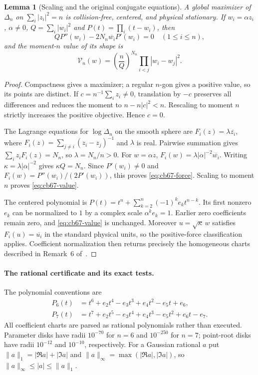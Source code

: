 \documentclass[11pt,a4paper]{article}
\newtheorem{lemma}[theorem]{Lemma}
\theoremstyle{remark}
\begin{document}
\begin{lemma}[Scaling and the original conjugate equations]
\label{lem:cb67-reduction}
A global maximizer of $\Delta_n$ on $\sum_i|z_i|^2=n$ is collision-free,
centered, and physical stationary. If $w_i=\alpha z_i$, $\alpha\ne0$,
$Q=\sum_i|w_i|^2$ and $P(t)=\prod_i(t-w_i)$, then
\begin{equation}\label{eq:cb67-force}
 QP''(w_i)-2N_n\overline{w_i}P'(w_i)=0\quad(1\le i\le n),
\end{equation}
and the moment-$n$ value of its shape is
\begin{equation}\label{eq:cb67-value}
 \mathcal V_n(w)=\left(\frac nQ\right)^{N_n}
                    \prod_{i<j}|w_i-w_j|^2.
\end{equation}
\end{lemma}
\begin{proof}
Compactness gives a maximizer; a regular $n$-gon gives a positive value,
so its points are distinct. If $c=n^{-1}\sum_i z_i\ne0$, translation by
$-c$ preserves all differences and reduces the moment to $n-n|c|^2<n$.
Rescaling to moment $n$ strictly increases the positive objective. Hence
$c=0$.

The Lagrange equations for $\log\Delta_n$ on the smooth sphere are
$F_i(z)=\lambda\overline{z_i}$, where
$F_i(z)=\sum_{j\ne i}(z_i-z_j)^{-1}$ and $\lambda$ is real.
Pairwise summation gives $\sum_i z_iF_i(z)=N_n$, so
$\lambda=N_n/n>0$. For $w=\alpha z$,
$F_i(w)=\lambda|\alpha|^{-2}\overline{w_i}$.
Writing $\kappa=\lambda|\alpha|^{-2}$ gives $\kappa Q=N_n$.
Since $P'(w_i)\ne0$ and $F_i(w)=P''(w_i)/(2P'(w_i))$, this proves
\eqref{eq:cb67-force}. Scaling to moment $n$ proves
\eqref{eq:cb67-value}.

The centered polynomial is
$P(t)=t^n+\sum_{k=2}^n(-1)^ke_k t^{n-k}$.
Its first nonzero $e_k$ can be normalized to $1$ by a complex scale
$\alpha^k e_k=1$. Earlier zero coefficients remain zero, and
\eqref{eq:cb67-value} is unchanged. Moreover $u=\sqrt\kappa\,w$ satisfies
$F_i(u)=\overline{u_i}$ in the standard physical units, so the positive-force
classification applies. Coefficient normalization then returns precisely
the homogeneous charts described in Remark~6 of~\cite{FS}.
\end{proof}

\paragraph{The rational certificate and its exact tests.}
The polynomial conventions are
\[
 \begin{split}
 P_6(t)&=t^6+e_2t^4-e_3t^3+e_4t^2-e_5t+e_6,\\
 P_7(t)&=t^7+e_2t^5-e_3t^4+e_4t^3-e_5t^2+e_6t-e_7.
 \end{split}
\]
All coefficient charts are parsed as rational polynomials rather than
executed. Parameter disks have radii $10^{-70}$ for $n=6$ and $10^{-250}$
for $n=7$; point-root disks have radii $10^{-12}$ and $10^{-10}$,
respectively. For a Gaussian rational $a$ put
$\|a\|_1=|\Re a|+|\Im a|$ and
$\|a\|_\infty=\max(|\Re a|,|\Im a|)$, so
$\|a\|_\infty\le |a|\le\|a\|_1$.
\end{document}

